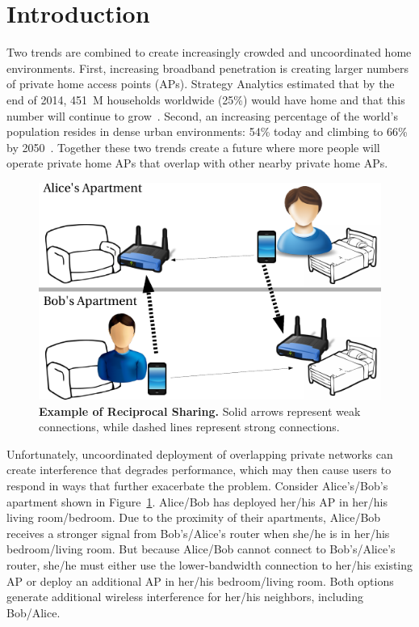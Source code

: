 \section{Introduction}
\label{sec-introduction}

Two trends are combined to create increasingly crowded and uncoordinated
home \wifi{} environments. First, increasing broadband penetration is
creating larger numbers of private home access points (APs). Strategy
Analytics estimated that by the end of 2014, 451~M households worldwide
(25\%) would have home \wifi{} and that this number will continue to
grow~\cite{wifi-survey}. Second, an increasing percentage of the world's
population resides in dense urban environments: 54\% today and climbing to
66\% by 2050~\cite{urbanization-survey}. Together these two trends create a
future where more people will operate private home APs that overlap with
other nearby private home APs.

\begin{figure}[t]
  \centering
  \includegraphics[width=0.9\columnwidth]{./figures/motivation.pdf}
  \caption{\textbf{Example of Reciprocal \wifi{} Sharing.} Solid arrows
  represent weak connections, while dashed lines represent strong
  connections.}
  \label{fig:motivation}
  \vspace*{-0.1in}
\end{figure}

Unfortunately, uncoordinated deployment of overlapping private networks can
create interference that degrades performance, which may then cause users to
respond in ways that further exacerbate the problem. Consider Alice's/Bob's
apartment shown in Figure~\ref{fig:motivation}. Alice/Bob has deployed
her/his AP in her/his living room/bedroom. Due to the proximity of their
apartments, Alice/Bob receives a stronger signal from Bob's/Alice's router
when she/he is in her/his bedroom/living room. But because Alice/Bob cannot
connect to Bob's/Alice's router, she/he must either use the lower-bandwidth
connection to her/his existing AP or deploy an additional AP in her/his
bedroom/living room. Both options generate additional wireless interference
for her/his neighbors, including Bob/Alice.

